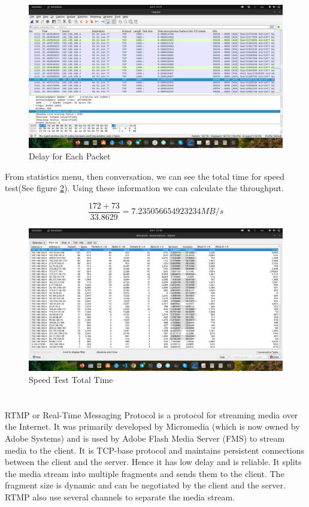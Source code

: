 \documentclass[en]{university}
\begin{document}
\begin{figure}
    \centering
    \includegraphics[width=\textwidth]{./resources/WSDelayEach.png}
    \caption{Delay for Each Packet}
    \label{fig:WSDelayEach}
\end{figure}

From statistics menu, then conversation, we can see the total time for speed test(See figure \ref{fig:WSDelayTotal}). Using these information we can calculate the throughput.

$$
    \frac{172 + 73}{33.8629} = 7.235056654923234 MB/s
$$

\begin{figure}
    \centering
    \includegraphics[width=\textwidth]{./resources/WSDelayTotal.png}
    \caption{Speed Test Total Time}
    \label{fig:WSDelayTotal}
\end{figure}

\section{}
RTMP or Real-Time Messaging Protocol is a protocol for streaming media over the Internet. It was primarily developed by Micromedia (which is now owned by Adobe Systems) and is used by Adobe Flash Media Server (FMS) to stream media to the client. It is TCP-base protocol and maintains persistent connections between the client and the server. Hence it has low delay and is reliable. It splits the media stream into multiple fragments and sends them to the client. The fragment size is dynamic and can be negotiated by the client and the server. RTMP also use several channels to separate the media stream. 
\end{document}

